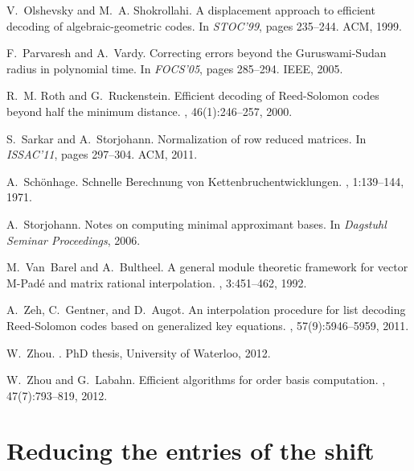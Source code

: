 \documentclass[preprint]{sig-alternate-05-2015}
\begin{document}
\begin{small}
\begin{thebibliography}{10}
V.~Olshevsky and M.~A. Shokrollahi.
\newblock A displacement approach to efficient decoding of algebraic-geometric
  codes.
\newblock In {\em STOC'99}, pages 235--244. ACM, 1999.

F.~Parvaresh and A.~Vardy.
\newblock Correcting errors beyond the {G}uruswami-{S}udan radius in polynomial
  time.
\newblock In {\em FOCS'05}, pages 285--294. IEEE, 2005.

R.~M. Roth and G.~Ruckenstein.
\newblock Efficient decoding of {R}eed-{S}olomon codes beyond half the minimum
  distance.
, 46(1):246--257, 2000.

S.~Sarkar and A.~Storjohann.
\newblock Normalization of row reduced matrices.
\newblock In {\em ISSAC'11}, pages 297--304. ACM, 2011.

A.~Sch{\"o}nhage.
\newblock Schnelle {Berechnung} {von} {Kettenbruchentwicklungen}.
, 1:139--144, 1971.

A.~Storjohann.
\newblock Notes on computing minimal approximant bases.
\newblock In {\em Dagstuhl Seminar Proceedings}, 2006.

M.~Van~Barel and A.~Bultheel.
\newblock A general module theoretic framework for vector {M-Pad\'e} and matrix
  rational interpolation.
, 3:451--462, 1992.

A.~Zeh, C.~Gentner, and D.~Augot.
\newblock An interpolation procedure for list decoding {R}eed-{S}olomon codes
  based on generalized key equations.
, 57(9):5946--5959, 2011.

W.~Zhou.
.
\newblock PhD thesis, University of Waterloo, 2012.

W.~Zhou and G.~Labahn.
\newblock Efficient algorithms for order basis computation.
, 47(7):793--819, 2012.

\end{thebibliography}
\end{small}


\appendix
\section{Reducing the entries of the shift}
\label{app:shift}
\end{document}
